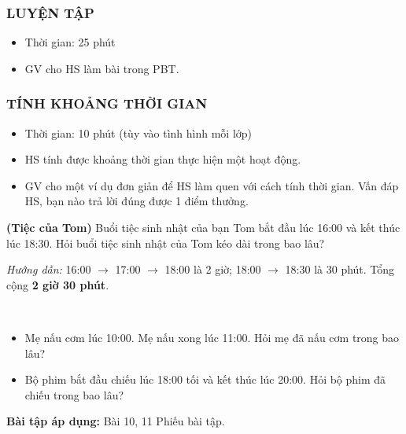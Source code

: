 \documentclass[../main.tex]{subfiles}
\begin{document}
\subsubsection{LUYỆN TẬP}
\begin{hd}
    \begin{itemize}
        \item Thời gian: 25 phút
    \end{itemize}
\end{hd}
\begin{itemize}
    \item GV cho HS làm bài trong PBT.
\end{itemize}

\subsubsection{TÍNH KHOẢNG THỜI GIAN}
\begin{hd}
    \begin{itemize}
        \item Thời gian: 10 phút (tùy vào tình hình mỗi lớp)
        \item HS tính được khoảng thời gian thực hiện một hoạt động.
    \end{itemize}
\end{hd}
\begin{itemize}
    \item GV cho một ví dụ đơn giản để HS làm quen với cách tính thời gian. Vấn đáp HS, bạn nào trả lời đúng được 1 điểm thưởng.
\end{itemize}
\begin{vd}
    \textbf{(Tiệc của Tom)} Buổi tiệc sinh nhật của bạn Tom bắt đầu lúc 16:00 và kết thúc lúc 18:30. Hỏi buổi tiệc sinh nhật của Tom kéo dài trong bao lâu?

    \textit{Hướng dẫn:} 16:00 $\rightarrow$ 17:00 $\rightarrow$ 18:00 là 2 giờ; 18:00 $\rightarrow$ 18:30 là 30 phút. Tổng cộng \textbf{2 giờ 30 phút}.
\end{vd}
\begin{vd}~
    \begin{itemize}
        \item Mẹ nấu cơm lúc 10:00. Mẹ nấu xong lúc 11:00. Hỏi mẹ đã nấu cơm trong bao lâu?
        \item Bộ phim bắt đầu chiếu lúc 18:00 tối và kết thúc lúc 20:00. Hỏi bộ phim đã chiếu trong bao lâu?
    \end{itemize}
\end{vd}
\textbf{Bài tập áp dụng:} Bài 10, 11 Phiếu bài tập.
\end{document}
